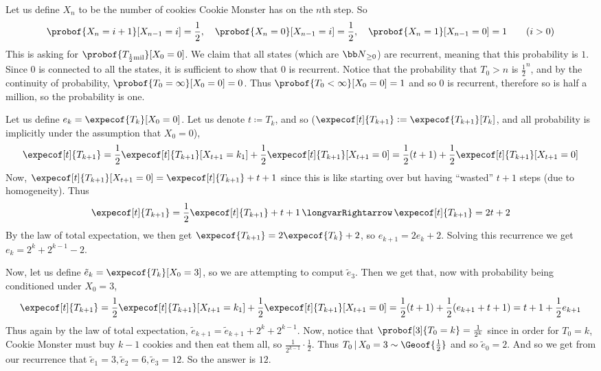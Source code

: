 \eexerc

\benum
    \item Let us define $X_n$ to be the number of cookies Cookie Monster has on the $n$th step.
    So
    $$ \probof{X_n=i+1}[X_{n-1}=i] = \frac12,\quad\probof{X_n=0}[X_{n-1}=i] = \frac12,\quad \probof{X_n=1}[X_{n-1}=0] = 1\qquad (i>0) $$
    This is asking for $\probof{T_{\frac12{\rm mil}}}[X_0=0]$.
    We claim that all states (which are ${\bb N}_{\geq0}$) are recurrent, meaning that this probability is $1$.
    Since $0$ is connected to all the states, it is sufficient to show that $0$ is recurrent.
    Notice that the probability that $T_0>n$ is $\frac12^n$, and by the continuity of probability, $\probof{T_0=\infty}[X_0=0]=0$.
    Thus $\probof{T_0<\infty}[X_0=0]=1$ and so $0$ is recurrent, therefore so is half a million, so the probability is one.

    \item Let us define $e_k=\expecof{T_k}[X_0=0]$.
    Let us denote $t\coloneqq T_k$, and so ($\expecof[t]{T_{k+1}}\coloneqq\expecof{T_{k+1}}[T_k]$, and all probability is implicitly under the assumption that $X_0=0$),
    $$ \expecof[t]{T_{k+1}} = \frac12\expecof[t]{T_{k+1}}[X_{t+1}=k_1] + \frac12\expecof[t]{T_{k+1}}[X_{t+1}=0] = \frac12(t+1) + \frac12\expecof[t]{T_{k+1}}[X_{t+1}=0] $$
    Now, $\expecof[t]{T_{k+1}}[X_{t+1}=0]=\expecof[t]{T_{k+1}}+t+1$ since this is like starting over but having ``wasted'' $t+1$ steps (due to homogeneity).
    Thus
    $$ \expecof[t]{T_{k+1}} = \frac12\expecof[t]{T_{k+1}} + t + 1 \implies \expecof[t]{T_{k+1}} = 2t + 2 $$
    By the law of total expectation, we then get $\expecof{T_{k+1}}=2\expecof{T_k}+2$, so $e_{k+1}=2e_k+2$.
    Solving this recurrence we get $e_k=2^k+2^{k-1}-2$.

    Now, let us define $\tilde e_k=\expecof{T_k}[X_0=3]$, so we are attempting to comput $\tilde e_3$.
    Then we get that, now with probability being conditioned under $X_0=3$,
    $$ \expecof[t]{T_{k+1}} = \frac12\expecof[t]{T_{k+1}}[X_{t+1}=k_1] + \frac12\expecof[t]{T_{k+1}}[X_{t+1}=0] = \frac12(t+1) + \frac12(e_{k+1}+t+1) = t+1 + \frac12e_{k+1} $$
    Thus again by the law of total expectation, $\tilde e_{k+1}=\tilde e_{k+1}+2^k+2^{k-1}$.
    Now, notice that $\probof[3]{T_0=k}=\frac1{2^k}$ since in order for $T_0=k$, Cookie Monster must buy $k-1$ cookies and then eat them all, so $\frac1{2^{k-1}}\cdot\frac12$.
    Thus $T_0\,|\,X_0=3\sim\Geoof{\frac12}$ and so $\tilde e_0=2$.
    And so we get from our recurrence that $\tilde e_1=3,\tilde e_2=6,\tilde e_3=12$.
    So the answer is $12$.

